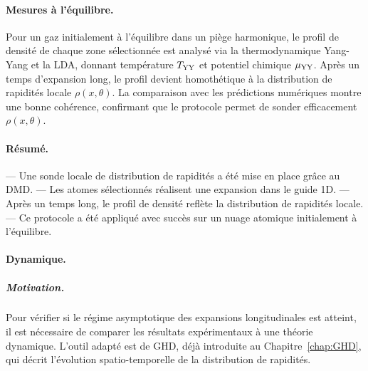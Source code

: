 \paragraph{Mesures à l’équilibre.}  
Pour un gaz initialement à l’équilibre dans un piège harmonique, le profil de densité de chaque zone sélectionnée est analysé via la thermodynamique Yang-Yang et la \gls{LDA}, donnant température \(T_{\rm YY}\) et potentiel chimique \(\mu_{\rm YY}\). Après un temps d’expansion long, le profil devient homothétique à la distribution de rapidités locale \(\rho(x,\theta)\). La comparaison avec les prédictions numériques montre une bonne cohérence, confirmant que le protocole permet de sonder efficacement \(\rho(x,\theta)\).

\paragraph{Résumé.}  
— Une sonde locale de distribution de rapidités a été mise en place grâce au \gls{DMD}.  
— Les atomes sélectionnés réalisent une expansion dans le guide 1D.  
— Après un temps long, le profil de densité reflète la distribution de rapidités locale.  
— Ce protocole a été appliqué avec succès sur un nuage atomique initialement à l’équilibre.

\paragraph{Dynamique.}
\subparagraph{Motivation.}
Pour vérifier si le régime asymptotique des expansions longitudinales est atteint, il est nécessaire de comparer les résultats expérimentaux à une théorie dynamique. L’outil adapté est de \gls{GHD}, déjà introduite au Chapitre~\ref{chap:GHD}, qui décrit l’évolution spatio-temporelle de la distribution de rapidités.

